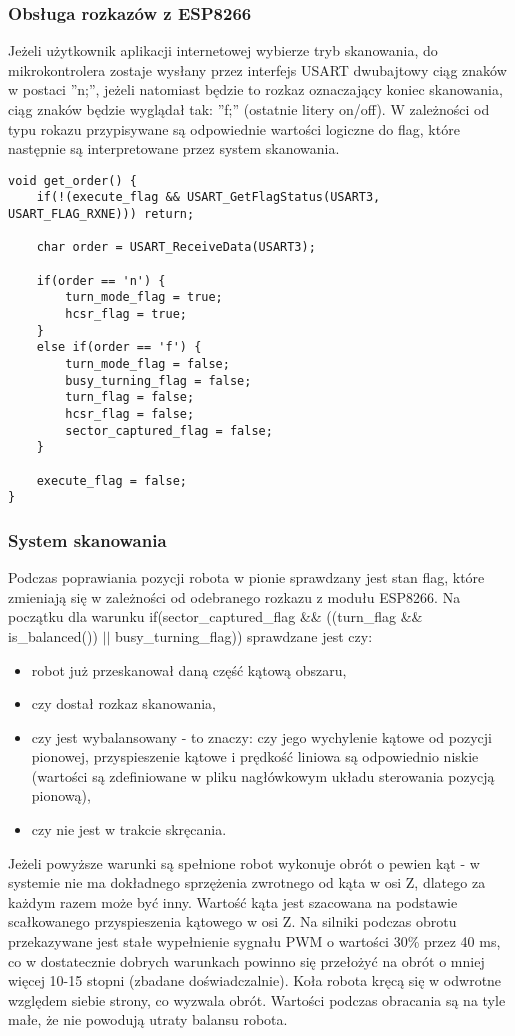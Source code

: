 \documentclass[a4paper,12pt,twoside,openany]{report}
\begin{document}
\subsubsection{Obsługa rozkazów z ESP8266}

Jeżeli użytkownik aplikacji internetowej wybierze tryb skanowania, do mikrokontrolera zostaje wysłany przez interfejs USART dwubajtowy ciąg znaków w postaci ''n;'', jeżeli natomiast będzie to rozkaz oznaczający koniec skanowania, ciąg znaków będzie wyglądał tak: ''f;'' (ostatnie litery on/off). W zależności od typu rokazu przypisywane są odpowiednie wartości logiczne do flag, które następnie są interpretowane przez system skanowania.

\begin{lstlisting}[style=customc]
void get_order() {
	if(!(execute_flag && USART_GetFlagStatus(USART3, USART_FLAG_RXNE))) return;

	char order = USART_ReceiveData(USART3);

	if(order == 'n') {
		turn_mode_flag = true;
		hcsr_flag = true;
	}
	else if(order == 'f') {
		turn_mode_flag = false;
		busy_turning_flag = false;
		turn_flag = false;
		hcsr_flag = false;
		sector_captured_flag = false;
	}

	execute_flag = false;
}
\end{lstlisting}

\subsubsection{System skanowania}

Podczas poprawiania pozycji robota w pionie sprawdzany jest stan flag, które zmieniają się w zależności od odebranego rozkazu z modułu ESP8266. Na początku dla warunku if(sector\_captured\_flag \&\& ((turn\_flag \&\& is\_balanced()) $\vert\vert$ busy\_turning\_flag)) sprawdzane jest czy:
\begin{itemize}
\item robot już przeskanował daną część kątową obszaru,
\item czy dostał rozkaz skanowania,
\item czy jest wybalansowany - to znaczy: czy jego wychylenie kątowe od pozycji pionowej, przyspieszenie kątowe i prędkość liniowa są odpowiednio niskie (wartości są zdefiniowane w pliku nagłówkowym układu sterowania pozycją pionową),
\item czy nie jest w trakcie skręcania.
\end{itemize}
Jeżeli powyższe warunki są spełnione robot wykonuje obrót o pewien kąt - w systemie nie ma dokładnego sprzężenia zwrotnego od kąta w osi Z, dlatego za każdym razem może być inny. Wartość kąta jest szacowana na podstawie scałkowanego przyspieszenia kątowego w osi Z. Na silniki podczas obrotu przekazywane jest stałe wypełnienie sygnału PWM o wartości 30\% przez 40 ms, co w dostatecznie dobrych warunkach powinno się przełożyć na obrót o mniej więcej 10-15 stopni (zbadane doświadczalnie). Koła robota kręcą się w odwrotne względem siebie strony, co wyzwala obrót. Wartości podczas obracania są na tyle małe, że nie powodują utraty balansu robota.
\end{document}
